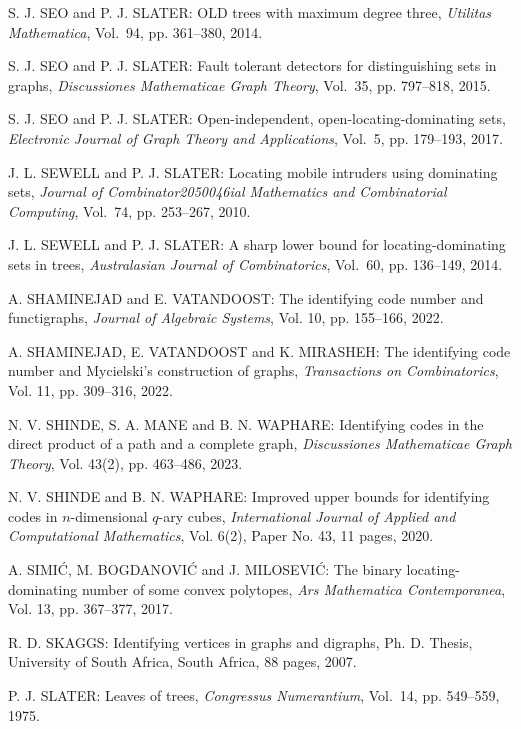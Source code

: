 \begin{thebibliography}{999}
S. J. SEO and P. J. SLATER: OLD trees with maximum degree three, {\it Utilitas Mathematica}, Vol.~94, pp. 361--380, 2014.

S. J. SEO and P. J. SLATER: Fault tolerant detectors for distinguishing sets in graphs, {\it Discussiones Mathematicae Graph Theory}, Vol.~35, pp. 797--818, 2015. 
  
S. J. SEO and P. J. SLATER: Open-independent, open-locating-dominating sets, {\it Electronic Journal of Graph Theory and Applications}, Vol.~5, pp. 179--193, 2017.

J. L. SEWELL and P. J. SLATER: Locating mobile intruders using dominating sets, {\it Journal of Combinator2050046ial Mathematics and Combinatorial Computing}, Vol.~74, pp. 253--267, 2010.

J. L. SEWELL and P. J. SLATER: A sharp lower bound for locating-dominating sets in trees, {\it Australasian Journal of Combinatorics}, Vol.~60, pp. 136--149, 2014.

A. SHAMINEJAD and E. VATANDOOST: The identifying code number and functigraphs, {\it Journal of Algebraic Systems}, Vol. 10, pp. 155--166, 2022.

A. SHAMINEJAD, E. VATANDOOST and K. MIRASHEH: The identifying code number and Mycielski's construction of graphs, {\it Transactions on Combinatorics}, Vol. 11, pp. 309--316, 2022.

N. V. SHINDE, S. A. MANE and B. N. WAPHARE: Identifying codes in the direct product of a path and a complete graph, {\it Discussiones Mathematicae Graph Theory}, Vol. 43(2), pp. 463--486, 2023.

N. V. SHINDE and B. N. WAPHARE: Improved upper bounds for identifying codes in $n$-dimensional $q$-ary cubes, {\it International Journal of Applied and Computational Mathematics}, Vol. 6(2), Paper No. 43, 11 pages, 2020.

A. SIMI\'C, M. BOGDANOVI\'C and J. MILOSEVI\'C: The binary locating-dominating number of some convex polytopes, {\it Ars Mathematica Contemporanea}, Vol. 13, pp. 367--377, 2017.    

R. D. SKAGGS: Identifying vertices in graphs and digraphs, Ph. D. Thesis, University of South Africa, South Africa, 88 pages, 2007.

P. J. SLATER: Leaves of trees, {\it Congressus Numerantium}, Vol.~14, pp. 549--559, 1975.


\end{thebibliography}
